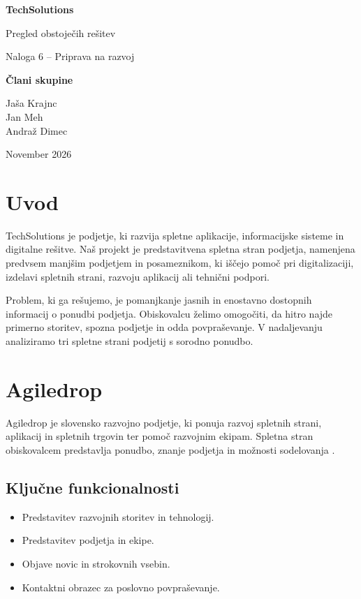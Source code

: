 \documentclass[12pt,a4paper]{article}
\begin{document}
\begin{titlepage}
\centering
\vspace*{3cm}
{\Huge\bfseries TechSolutions\par}
\vspace{0.7cm}
{\LARGE Pregled obstoječih rešitev\par}
\vspace{1.5cm}
{\large Naloga 6 -- Priprava na razvoj\par}
\vfill
{\large\textbf{Člani skupine}\par Jaša Krajnc\\ Jan Meh\\ Andraž Dimec\par}
\vfill
{\large November 2026\par}
\end{titlepage}
\tableofcontents
\newpage
\section{Uvod}
TechSolutions je podjetje, ki razvija spletne aplikacije, informacijske sisteme in digitalne rešitve. Naš projekt je predstavitvena spletna stran podjetja, namenjena predvsem manjšim podjetjem in posameznikom, ki iščejo pomoč pri digitalizaciji, izdelavi spletnih strani, razvoju aplikacij ali tehnični podpori.

Problem, ki ga rešujemo, je pomanjkanje jasnih in enostavno dostopnih informacij o ponudbi podjetja. Obiskovalcu želimo omogočiti, da hitro najde primerno storitev, spozna podjetje in odda povpraševanje. V nadaljevanju analiziramo tri spletne strani podjetij s sorodno ponudbo.
\section{Agiledrop}
Agiledrop je slovensko razvojno podjetje, ki ponuja razvoj spletnih strani, aplikacij in spletnih trgovin ter pomoč razvojnim ekipam. Spletna stran obiskovalcem predstavlja ponudbo, znanje podjetja in možnosti sodelovanja \cite{agiledrop,agiledropkontakt}.
\subsection*{Ključne funkcionalnosti}
\begin{itemize}\item Predstavitev razvojnih storitev in tehnologij.\item Predstavitev podjetja in ekipe.\item Objave novic in strokovnih vsebin.\item Kontaktni obrazec za poslovno povpraševanje.\end{itemize}
\end{document}

